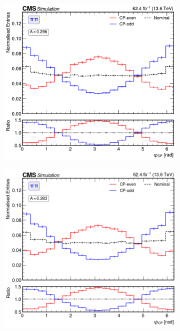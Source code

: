 \begin{figure}[!htbp]
        \centering
        \begin{subfigure}[b]{0.49\textwidth}
            \centering
            \includegraphics[width=\textwidth]{Figures/Chapter7/Acoplanarity/Without_IP/aco_pi_pi.pdf}
            \caption{}
        \end{subfigure}
        \begin{subfigure}[b]{0.49\textwidth}
            \centering
            \includegraphics[width=\textwidth]{Figures/Chapter7/Acoplanarity/With_IP/aco_pi_pi.png}
            \caption{}
        \end{subfigure}


\end{figure}
